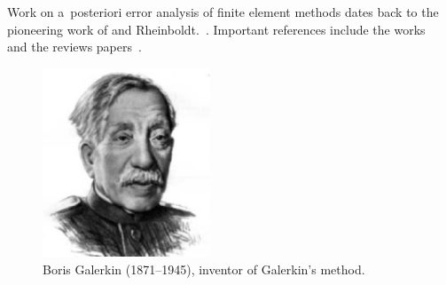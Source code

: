 Work on a~posteriori error analysis of finite element methods dates
back to the pioneering work of \babuska{} and
Rheinboldt.~\cite{BabuvskaRheinboldt1978}. Important references
include the works~\cite{BankWeiser1985,ZienkiewiczZhu1987,
ErikssonJohnson1991,ErikssonJohnson1995a,ErikssonJohnsonIII,ErikssonJohnson1995c,ErikssonJohnson1995,ErikssonJohnsonEtAl1998,AinsworthOden1993}
and the reviews
papers~\cite{ErikssonEstepEtAl1995,Verfurth1994,Verfurth1999,AinsworthOden2000,BeckerRannacher2001}.

\begin{figure}
  \begin{center}
    \includegraphics[width=5cm]{chapters/kirby-7/eps/Boris_Galerkin.eps}
    \caption{Boris Galerkin (1871--1945), inventor of Galerkin's method.}
    \label{fig:galerkin}
  \end{center}
\end{figure}


